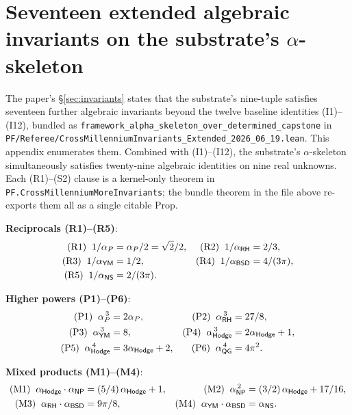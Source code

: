 \documentclass[11pt,a4paper]{amsart}
\theoremstyle{plain}
\theoremstyle{definition}
\begin{document}
\section{Seventeen extended algebraic invariants on the substrate's $\alpha$-skeleton}\label{app:extended}

The paper's \S\ref{sec:invariants} states that the substrate's nine-tuple satisfies seventeen further algebraic invariants beyond the twelve baseline identities (I1)--(I12), bundled as \texttt{framework\_alpha\_skeleton\_over\_determined\_capstone} in \texttt{PF/Referee/CrossMillenniumInvariants\_Extended\_2026\_06\_19.lean}. This appendix enumerates them. Combined with (I1)--(I12), the substrate's $\alpha$-skeleton simultaneously satisfies twenty-nine algebraic identities on nine real unknowns. Each (R1)--(S2) clause is a kernel-only theorem in \texttt{PF.CrossMillenniumMoreInvariants}; the bundle theorem in the file above re-exports them all as a single citable Prop.

\noindent\textbf{Reciprocals \textup{(R1)--(R5)}}:
\begin{align*}
\textup{(R1)}\;\; 1/\alpha_P     &= \alpha_P / 2 = \sqrt{2}/2,&
\textup{(R2)}\;\; 1/\alpha_{\textsf{RH}}    &= 2/3,\\
\textup{(R3)}\;\; 1/\alpha_{\textsf{YM}}    &= 1/2,&
\textup{(R4)}\;\; 1/\alpha_{\textsf{BSD}}   &= 4/(3\pi),\\
\textup{(R5)}\;\; 1/\alpha_{\textsf{NS}}    &= 2/(3\pi).
\end{align*}

\noindent\textbf{Higher powers \textup{(P1)--(P6)}}:
\begin{align*}
\textup{(P1)}\;\; \alpha_P^{\,3}      &= 2\alpha_P,             & \textup{(P2)}\;\; \alpha_{\textsf{RH}}^{\,3}     &= 27/8,\\
\textup{(P3)}\;\; \alpha_{\textsf{YM}}^{\,3}     &= 8,                    & \textup{(P4)}\;\; \alpha_{\textsf{Hodge}}^{\,3}  &= 2\alpha_{\textsf{Hodge}} + 1,\\
\textup{(P5)}\;\; \alpha_{\textsf{Hodge}}^{\,4}  &= 3\alpha_{\textsf{Hodge}} + 2, & \textup{(P6)}\;\; \alpha_{\textsf{QG}}^{\,4}     &= 4\pi^2.
\end{align*}

\noindent\textbf{Mixed products \textup{(M1)--(M4)}}:
\begin{align*}
\textup{(M1)}\;\; \alpha_{\textsf{Hodge}}\cdot\alpha_{\textsf{NP}} &= (5/4)\,\alpha_{\textsf{Hodge}} + 1, & \textup{(M2)}\;\; \alpha_{\textsf{NP}}^{\,2}              &= (3/2)\,\alpha_{\textsf{Hodge}} + 17/16,\\
\textup{(M3)}\;\; \alpha_{\textsf{RH}}\cdot\alpha_{\textsf{BSD}}    &= 9\pi/8,                              & \textup{(M4)}\;\; \alpha_{\textsf{YM}}\cdot\alpha_{\textsf{BSD}}  &= \alpha_{\textsf{NS}}.
\end{align*}
\end{document}
